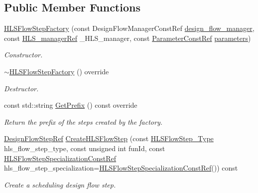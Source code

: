 \subsection*{Public Member Functions}
\begin{DoxyCompactItemize}
\item 
\hyperlink{classHLSFlowStepFactory_a8af54ca36375ae5819956b489f0fa72b}{H\+L\+S\+Flow\+Step\+Factory} (const Design\+Flow\+Manager\+Const\+Ref \hyperlink{classDesignFlowStepFactory_ae7854875d87ed8d2fb4d82b2fa017b79}{design\+\_\+flow\+\_\+manager}, const \hyperlink{hls__manager_8hpp_acd3842b8589fe52c08fc0b2fcc813bfe}{H\+L\+S\+\_\+manager\+Ref} \+\_\+\+H\+L\+S\+\_\+manager, const \hyperlink{Parameter_8hpp_a37841774a6fcb479b597fdf8955eb4ea}{Parameter\+Const\+Ref} \hyperlink{classDesignFlowStepFactory_ab2c8bba23db9f4066e1a27ee7157c2de}{parameters})
\begin{DoxyCompactList}\small\item\em Constructor. \end{DoxyCompactList}\item 
\hyperlink{classHLSFlowStepFactory_aca3fa064be068b4e32b4e5262e6436f5}{$\sim$\+H\+L\+S\+Flow\+Step\+Factory} () override
\begin{DoxyCompactList}\small\item\em Destructor. \end{DoxyCompactList}\item 
const std\+::string \hyperlink{classHLSFlowStepFactory_a84c60dc2d5dfbeccd7c631861a5bb93f}{Get\+Prefix} () const override
\begin{DoxyCompactList}\small\item\em Return the prefix of the steps created by the factory. \end{DoxyCompactList}\item 
\hyperlink{design__flow__step_8hpp_a9dd6b4474ddf52d41a78b1aaa12ae6c8}{Design\+Flow\+Step\+Ref} \hyperlink{classHLSFlowStepFactory_ae5460c506f214e7b874e267e18ca8531}{Create\+H\+L\+S\+Flow\+Step} (const \hyperlink{hls__step_8hpp_ada16bc22905016180e26fc7e39537f8d}{H\+L\+S\+Flow\+Step\+\_\+\+Type} hls\+\_\+flow\+\_\+step\+\_\+type, const unsigned int fun\+Id, const \hyperlink{hls__step_8hpp_a5fdd2edf290c196531d21d68e13f0e74}{H\+L\+S\+Flow\+Step\+Specialization\+Const\+Ref} hls\+\_\+flow\+\_\+step\+\_\+specialization=\hyperlink{hls__step_8hpp_a5fdd2edf290c196531d21d68e13f0e74}{H\+L\+S\+Flow\+Step\+Specialization\+Const\+Ref}()) const
\begin{DoxyCompactList}\small\item\em Create a scheduling design flow step. \end{DoxyCompactList}\item 

\end{DoxyCompactItemize}
